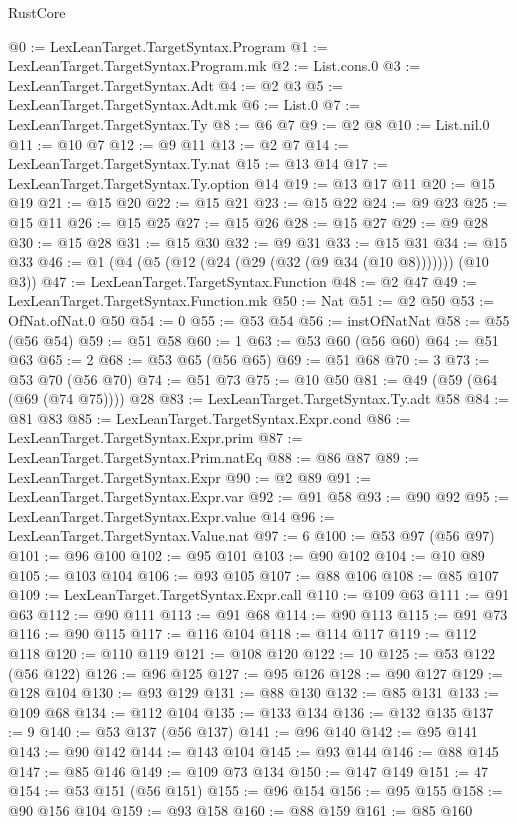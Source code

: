 \begin{lexlean}{RustCore}
\begin{coremodule}
@0 := LexLeanTarget.TargetSyntax.Program
@1 := LexLeanTarget.TargetSyntax.Program.mk
@2 := List.cons.{0}
@3 := LexLeanTarget.TargetSyntax.Adt
@4 := @2 @3
@5 := LexLeanTarget.TargetSyntax.Adt.mk
@6 := List.{0}
@7 := LexLeanTarget.TargetSyntax.Ty
@8 := @6 @7
@9 := @2 @8
@10 := List.nil.{0}
@11 := @10 @7
@12 := @9 @11
@13 := @2 @7
@14 := LexLeanTarget.TargetSyntax.Ty.nat
@15 := @13 @14
@17 := LexLeanTarget.TargetSyntax.Ty.option @14
@19 := @13 @17 @11
@20 := @15 @19
@21 := @15 @20
@22 := @15 @21
@23 := @15 @22
@24 := @9 @23
@25 := @15 @11
@26 := @15 @25
@27 := @15 @26
@28 := @15 @27
@29 := @9 @28
@30 := @15 @28
@31 := @15 @30
@32 := @9 @31
@33 := @15 @31
@34 := @15 @33
@46 := @1 (@4 (@5 (@12 (@24 (@29 (@32 (@9 @34 (@10 @8))))))) (@10 @3))
@47 := LexLeanTarget.TargetSyntax.Function
@48 := @2 @47
@49 := LexLeanTarget.TargetSyntax.Function.mk
@50 := Nat
@51 := @2 @50
@53 := OfNat.ofNat.{0} @50
@54 := 0
@55 := @53 @54
@56 := instOfNatNat
@58 := @55 (@56 @54)
@59 := @51 @58
@60 := 1
@63 := @53 @60 (@56 @60)
@64 := @51 @63
@65 := 2
@68 := @53 @65 (@56 @65)
@69 := @51 @68
@70 := 3
@73 := @53 @70 (@56 @70)
@74 := @51 @73
@75 := @10 @50
@81 := @49 (@59 (@64 (@69 (@74 @75)))) @28
@83 := LexLeanTarget.TargetSyntax.Ty.adt @58
@84 := @81 @83
@85 := LexLeanTarget.TargetSyntax.Expr.cond
@86 := LexLeanTarget.TargetSyntax.Expr.prim
@87 := LexLeanTarget.TargetSyntax.Prim.natEq
@88 := @86 @87
@89 := LexLeanTarget.TargetSyntax.Expr
@90 := @2 @89
@91 := LexLeanTarget.TargetSyntax.Expr.var
@92 := @91 @58
@93 := @90 @92
@95 := LexLeanTarget.TargetSyntax.Expr.value @14
@96 := LexLeanTarget.TargetSyntax.Value.nat
@97 := 6
@100 := @53 @97 (@56 @97)
@101 := @96 @100
@102 := @95 @101
@103 := @90 @102
@104 := @10 @89
@105 := @103 @104
@106 := @93 @105
@107 := @88 @106
@108 := @85 @107
@109 := LexLeanTarget.TargetSyntax.Expr.call
@110 := @109 @63
@111 := @91 @63
@112 := @90 @111
@113 := @91 @68
@114 := @90 @113
@115 := @91 @73
@116 := @90 @115
@117 := @116 @104
@118 := @114 @117
@119 := @112 @118
@120 := @110 @119
@121 := @108 @120
@122 := 10
@125 := @53 @122 (@56 @122)
@126 := @96 @125
@127 := @95 @126
@128 := @90 @127
@129 := @128 @104
@130 := @93 @129
@131 := @88 @130
@132 := @85 @131
@133 := @109 @68
@134 := @112 @104
@135 := @133 @134
@136 := @132 @135
@137 := 9
@140 := @53 @137 (@56 @137)
@141 := @96 @140
@142 := @95 @141
@143 := @90 @142
@144 := @143 @104
@145 := @93 @144
@146 := @88 @145
@147 := @85 @146
@149 := @109 @73 @134
@150 := @147 @149
@151 := 47
@154 := @53 @151 (@56 @151)
@155 := @96 @154
@156 := @95 @155
@158 := @90 @156 @104
@159 := @93 @158
@160 := @88 @159
@161 := @85 @160

\end{coremodule}
\end{lexlean}
